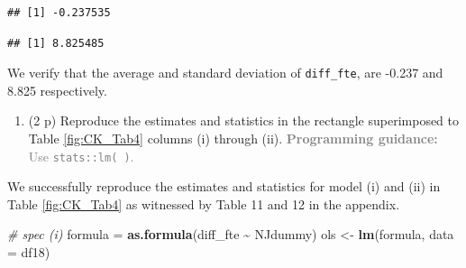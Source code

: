 \documentclass[
]{article}
\newenvironment{Shaded}{\begin{snugshade}}{\end{snugshade}}
\newcommand{\AttributeTok}[1]{\textcolor[rgb]{0.13,0.29,0.53}{#1}}
\newcommand{\CommentTok}[1]{\textcolor[rgb]{0.56,0.35,0.01}{\textit{#1}}}
\newcommand{\DecValTok}[1]{\textcolor[rgb]{0.00,0.00,0.81}{#1}}
\newcommand{\FunctionTok}[1]{\textcolor[rgb]{0.13,0.29,0.53}{\textbf{#1}}}
\newcommand{\NormalTok}[1]{#1}
\newcommand{\OtherTok}[1]{\textcolor[rgb]{0.56,0.35,0.01}{#1}}
\newcommand{\SpecialCharTok}[1]{\textcolor[rgb]{0.81,0.36,0.00}{\textbf{#1}}}
\providecommand{\tightlist}{%
  \setlength{\itemsep}{0pt}\setlength{\parskip}{0pt}}
\begin{document}
\begin{verbatim}
## [1] -0.237535
\end{verbatim}

\begin{Shaded}
\end{Shaded}

\begin{verbatim}
## [1] 8.825485
\end{verbatim}

We verify that the average and standard deviation of \texttt{diff\_fte},
are -0.237 and 8.825 respectively.

\begin{enumerate}
\def\labelenumi{\alph{enumi}.}
\setcounter{enumi}{2}
\tightlist
\item
  (2 p) Reproduce the estimates and statistics in the rectangle
  superimposed to Table \ref{fig:CK_Tab4} columns (i) through (ii).
  \textcolor{gray}{\textbf{Programming guidance:} Use \texttt{stats::lm( )}.}
\end{enumerate}

We successfully reproduce the estimates and statistics for model (i) and
(ii) in Table \ref{fig:CK_Tab4} as witnessed by Table 11 and 12 in the
appendix.

\begin{Shaded}
\end{Shaded}

\begin{Shaded}
\begin{Highlighting}[]
\CommentTok{\# spec (i)}
\NormalTok{formula }\OtherTok{=} \FunctionTok{as.formula}\NormalTok{(diff\_fte }\SpecialCharTok{\textasciitilde{}}\NormalTok{ NJdummy)}
\NormalTok{ols }\OtherTok{\textless{}{-}} \FunctionTok{lm}\NormalTok{(formula, }\AttributeTok{data =}\NormalTok{ df18)}
\end{Highlighting}
\end{Shaded}
\end{document}
